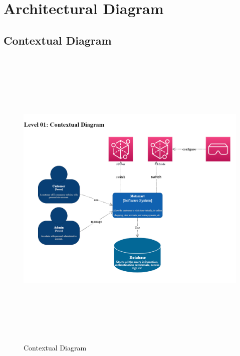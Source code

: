 \section{Architectural Diagram}
\subsection{Contextual Diagram}
\begin{figure}[H]
    \centering
    \includegraphics[width=15cm,height=15cm]{Figures/Diagrams/ArchitecturalDiagram/ContextualDiagram.png}
    \caption{Contextual Diagram}
    \label{Contextual Diagram}
\end{figure}
